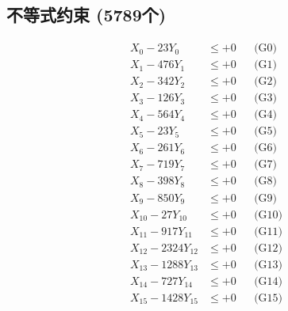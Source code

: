 \documentclass[a4paper,10pt]{article}
\begin{document}
\subsection{不等式约束 (5789个)}

\allowdisplaybreaks
{\small
\begin{align}
\allowbreak
\allowbreak
\allowbreak
\allowbreak
\allowbreak
\allowbreak
\allowbreak
\allowbreak
\allowbreak
\allowbreak
\allowbreak
\allowbreak
\allowbreak
\allowbreak
\allowbreak
\allowbreak
\allowbreak
\allowbreak
\allowbreak
\allowbreak
\allowbreak
\allowbreak
\allowbreak
\allowbreak
\allowbreak
\allowbreak
\allowbreak
\allowbreak
\allowbreak
\allowbreak
\allowbreak
\allowbreak
\allowbreak
\allowbreak
\allowbreak
\allowbreak
\allowbreak
\allowbreak
\allowbreak
\allowbreak
\allowbreak
\allowbreak
\allowbreak
\allowbreak
\allowbreak
\allowbreak
\allowbreak
\allowbreak
\allowbreak
\allowbreak
\allowbreak
\allowbreak
\allowbreak
\allowbreak
\allowbreak
\allowbreak
\allowbreak
\allowbreak
\allowbreak
\allowbreak
\allowbreak
\allowbreak
\allowbreak
\allowbreak
\allowbreak
\allowbreak
\allowbreak
\allowbreak
\allowbreak
\allowbreak
\allowbreak
\allowbreak
\allowbreak
\allowbreak
\allowbreak
\allowbreak
\allowbreak
\allowbreak
X_{0} - 23Y_{0} &\leq +0 && \text{(G0)} \\
\allowbreak
X_{1} - 476Y_{1} &\leq +0 && \text{(G1)} \\
X_{2} - 342Y_{2} &\leq +0 && \text{(G2)} \\
X_{3} - 126Y_{3} &\leq +0 && \text{(G3)} \\
X_{4} - 564Y_{4} &\leq +0 && \text{(G4)} \\
X_{5} - 23Y_{5} &\leq +0 && \text{(G5)} \\
X_{6} - 261Y_{6} &\leq +0 && \text{(G6)} \\
X_{7} - 719Y_{7} &\leq +0 && \text{(G7)} \\
X_{8} - 398Y_{8} &\leq +0 && \text{(G8)} \\
X_{9} - 850Y_{9} &\leq +0 && \text{(G9)} \\
X_{10} - 27Y_{10} &\leq +0 && \text{(G10)} \\
\allowbreak
X_{11} - 917Y_{11} &\leq +0 && \text{(G11)} \\
X_{12} - 2324Y_{12} &\leq +0 && \text{(G12)} \\
X_{13} - 1288Y_{13} &\leq +0 && \text{(G13)} \\
X_{14} - 727Y_{14} &\leq +0 && \text{(G14)} \\
X_{15} - 1428Y_{15} &\leq +0 && \text{(G15)} \\

\end{align}}
\end{document}
